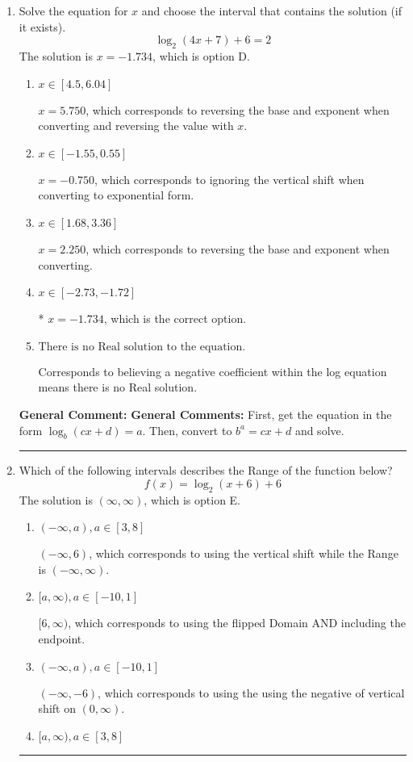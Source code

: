 \documentclass{extbook}[14pt]
\newcommand{\litem}[1]{\item #1

\rule{\textwidth}{0.4pt}}
\begin{document}
\begin{enumerate}\litem{
Solve the equation for $x$ and choose the interval that contains the solution (if it exists).
\[ \log_{2}{(4x+7)}+6 = 2 \]The solution is \( x = -1.734 \), which is option D.\begin{enumerate}[label=\Alph*.]
\item \( x \in [4.5, 6.04] \)

$x = 5.750$, which corresponds to reversing the base and exponent when converting and reversing the value with $x$.
\item \( x \in [-1.55, 0.55] \)

$x = -0.750$, which corresponds to ignoring the vertical shift when converting to exponential form.
\item \( x \in [1.68, 3.36] \)

$x = 2.250$, which corresponds to reversing the base and exponent when converting.
\item \( x \in [-2.73, -1.72] \)

* $x = -1.734$, which is the correct option.
\item \( \text{There is no Real solution to the equation.} \)

Corresponds to believing a negative coefficient within the log equation means there is no Real solution.
\end{enumerate}

\textbf{General Comment:} \textbf{General Comments:} First, get the equation in the form $\log_b{(cx+d)} = a$. Then, convert to $b^a = cx+d$ and solve.
}
\litem{
Which of the following intervals describes the Range of the function below?
\[ f(x) = \log_2{(x+6)}+6 \]The solution is \( (\infty, \infty) \), which is option E.\begin{enumerate}[label=\Alph*.]
\item \( (-\infty, a), a \in [3, 8] \)

$(-\infty, 6)$, which corresponds to using the vertical shift while the Range is $(-\infty, \infty)$.
\item \( [a, \infty), a \in [-10, 1] \)

$[6, \infty)$, which corresponds to using the flipped Domain AND including the endpoint.
\item \( (-\infty, a), a \in [-10, 1] \)

$(-\infty, -6)$, which corresponds to using the using the negative of vertical shift on $(0, \infty)$.
\item \( [a, \infty), a \in [3, 8] \)


\end{enumerate}}
\end{enumerate}
\end{document}
